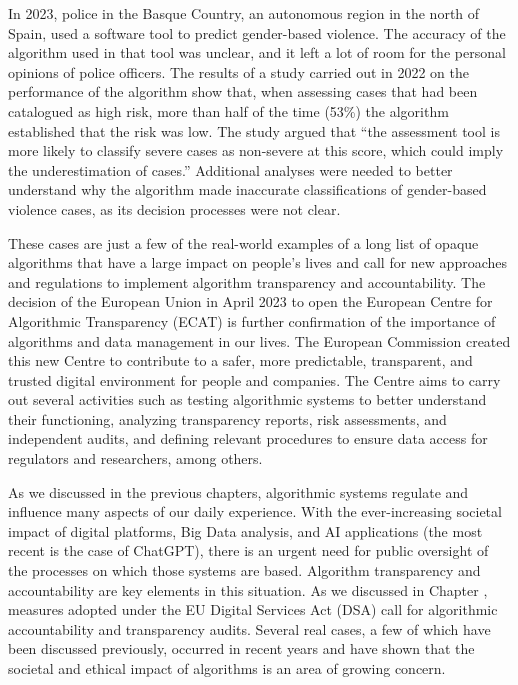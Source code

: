 In 2023, police in the Basque Country, an autonomous region in the north of Spain, used a software tool to predict gender-based violence. The accuracy of the algorithm used in that tool was unclear, and it left a lot of room for the personal opinions of police officers. The results of a study carried out in 2022 on the performance of the algorithm show that, when assessing cases that had been catalogued as high risk, more than half of the time (53\%) the algorithm established that the risk was low. The study argued that ``the assessment tool is more likely to classify severe cases as non-severe at this score, which could imply the underestimation of cases.'' Additional analyses were needed to better understand why the algorithm made inaccurate classifications of gender-based violence cases, as its decision processes were not clear.

These cases are just a few of the real-world examples of a long list of opaque algorithms that have a large impact on people's lives and call for new approaches and regulations to implement algorithm transparency and accountability. The decision of the European Union in April 2023 to open the European Centre for Algorithmic Transparency (ECAT) is further confirmation of the importance of algorithms and data management in our lives. The European Commission created this new Centre to contribute to a safer, more predictable, transparent, and trusted digital environment for people and companies. The Centre aims to carry out several activities such as testing algorithmic systems to better understand their functioning, analyzing transparency reports, risk assessments, and independent audits, and defining relevant procedures to ensure data access for regulators and researchers, among others.

As we discussed in the previous chapters, algorithmic systems regulate and influence many aspects of our daily experience. With the ever-increasing societal impact of digital platforms, Big Data analysis, and AI applications (the most recent is the case of ChatGPT), there is an urgent need for public oversight of the processes on which those systems are based. Algorithm transparency and accountability are key elements in this situation. As we discussed in Chapter , measures adopted under the EU Digital Services Act (DSA) call for algorithmic accountability and transparency audits. Several real cases, a few of which have been discussed previously, occurred in recent years and have shown that the societal and ethical impact of algorithms is an area of growing concern.

